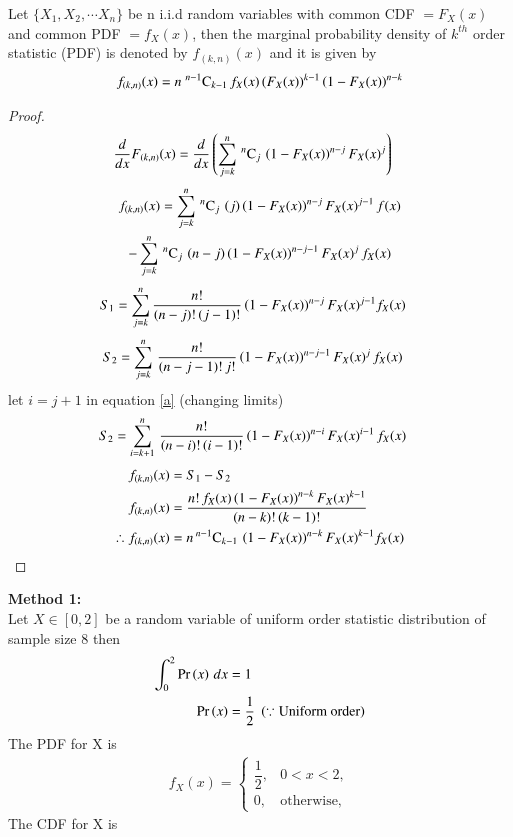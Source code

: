 \documentclass[journal,12pt,twocolumn]{IEEEtran}
\begin{document}
\begin{theorem}
Let $\{X_1, X_2, \cdots X_n\}$ be n i.i.d random variables with common CDF $= F_{X}(x)$ and common PDF $= f_{X}(x)$, 
then the marginal probability density of $k^{th}$ order statistic (PDF) is denoted by $f_{(k,n)}(x)$  and it
is given by
\begin{align}
f_{(k,n)}(x) = n\;{}^{n-1}\mathrm{C}_{k-1}\,f_{X}(x)\,(F_{X}(x))^{k-1}\left(1-F_{X}(x)\right)^{n-k} \label{eqn_2}
\end{align}
\label{th2}
\end{theorem}
\begin{proof}
\begin{align}
\dfrac{d}{dx} F_{(k,n)}(x) &= \dfrac{d}{dx}\left(\sum_{j=k}^{n}\,{}^{n}\mathrm{C}_{j}\,\left(1-F_{X}(x)\right)^{n-j} F_{X}(x)^{j}\right) 
 \end{align}
\begin{multline}
f_{(k,n)}(x) = \sum_{j=k}^{n}\,{}^{n}\mathrm{C}_{j}\,\left(j\right)\left(1-F_{X}(x)\right)^{n-j}F_{X}(x)^{j-1}\,f(x)  \\
                -\sum_{j=k}^{n}\,{}^{n}\mathrm{C}_{j}\,\left(n-j\right)\left(1-F_{X}(x)\right)^{n-j-1}F_{X}(x)^{j}\,f_{X}(x) 
\end{multline}
\begin{align}
S_1  &= \sum_{j=k}^{n} \dfrac{n!}{(n-j)!\,(j-1)!}\left(1-F_{X}(x)\right)^{n-j}F_{X}(x)^{j-1} f_{X}(x) 
\end{align}
\begin{align}
S_2  &= \sum_{j=k}^{n}\,\dfrac{n!}{(n-j-1)!\,j!}\left(1-F_{X}(x)\right)^{n-j-1}F_{X}(x)^{j}\,f_{X}(x) \label{a}
\end{align}
let $i = j+1$ in equation \eqref{a} (changing limits)
\begin{align}
S_2  &= \sum_{i=k+1}^{n}\,\dfrac{n!}{(n-i)!\,(i-1)!}\left(1-F_{X}(x)\right)^{n-i}F_{X}(x)^{i-1}\,f_{X}(x) 
\end{align}
\begin{align}
f_{(k,n)}(x) &= S_1 - S_2 \\
f_{(k,n)}(x) &= \dfrac{n!\,f_{X}(x)\left(1-F_{X}(x)\right)^{n-k}F_{X}(x)^{k-1}}{(n-k)!\,(k-1)!}\\
\therefore f_{(k,n)}(x) &= n\,{}^{n-1}\mathrm{C}_{k-1}\,\left(1-F_{X}(x)\right)^{n-k}F_{X}(x)^{k-1} f_{X}(x)
\end{align}
\end{proof}
\textbf{Method 1:} \\
Let $X\in[0,2]$ be a random variable of uniform order statistic distribution of sample size 8 then
\begin{align}
 \int_{0}^{2} \Pr\left(x\right)\,dx &= 1 \\
 \Pr\left(x\right)                  &= \dfrac{1}{2}\;\left(\because \text{Uniform order}\right)
\end{align}
The PDF for X is 
\begin{align}
f_{X}(x) = 
 \begin{cases}
  \dfrac{1}{2},      &0<x<2, \\ 
     0, &\text{otherwise,}
 \end{cases} \label{d}
\end{align}
 The CDF for X is 
 
\end{document}
